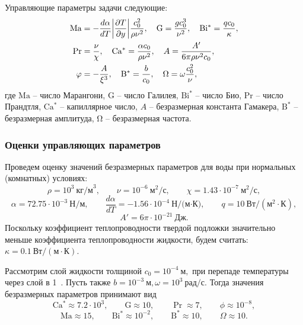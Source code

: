 \documentclass[12pt,a4paper]{article}
\begin{document}

Управляющие параметры задачи следующие:
\begin{equation*}
\begin{aligned}
	\mathrm{Ma} &= -\frac{d \alpha}{dT}  \abs{\frac{\partial T}{\partial y} } \frac{c_0^2}{\rho \nu^2}, \quad
	\mathrm{G} = \frac{g c_0^3}{\nu^2}, \quad
	\mathrm{Bi^*} = \frac{q c_0}{\kappa}, \\
	\mathrm{Pr} &= \frac{\nu}{\chi}, \quad
	\mathrm{Ca^*} = \frac{\alpha c_0}{\rho \nu^2}, \quad
	A = \frac{A'}{6 \pi \rho \nu^2 c_0}, \\
	\varphi &= -\frac{A}{\xi^3}, \quad
	\mathrm{B}^{*} = \frac{b}{c_0}, \quad
	\Omega = \omega \frac{c_0^2}{\nu},
\end{aligned}
\end{equation*}
где $\mathrm{Ma}$ -- число Марангони, $\mathrm{G}$ -- число Галилея, $\mathrm{Bi^*}$ -- число Био, $\mathrm{Pr}$ -- число Прандтля, $\mathrm{Ca^*}$ -- капиллярное число, ${A}$ -- безразмерная константа Гамакера, $\mathrm{B^*}$ -- безразмерная амплитуда, $\mathrm{\Omega}$ -- безразмерная частота.


\subsubsection*{Оценки управляющих параметров}\label{sec:governing_params_estimation_thermal}

Проведем оценку значений безразмерных параметров для воды при нормальных (комнатных) условиях:
\[
\rho = 10^3~\text{кг/м}^3,\qquad
\nu = 10^{-6}~\text{м}^2/\text{с},\qquad
\chi = 1.43 \cdot 10^{-7}~\text{м}^2/\text{с},
\]
\[
\alpha = 72.75 \cdot 10^{-3}~\text{Н/м}, \qquad
\frac{d\alpha}{dT} = -1.56 \cdot 10^{-4}~\text{Н/(м·К)}, \qquad
q = 10~\text{Вт}/(\text{м}^2 \cdot \text{К}),
\]
\[
A' = 6\pi \cdot 10^{-21}~\text{Дж}. 
\]
Поскольку коэффициент теплопроводности твердой подложки значительно меньше коэффициента теплопроводности жидкости, будем считать: $\kappa = 0.1~\text{Вт}/(\text{м}\cdot\text{К}).$

Рассмотрим слой жидкости толщиной $c_0 = 10^{-4}~\text{м},$ при перепаде температуры через слой в 1~. Пусть также $ b = 10^{-3}~\text{м},\omega = 10^3~\text{рад/с}.$
Тогда значения безразмерных параметров принимают вид
\begin{equation*}
	\mathrm{Ca^*} \approx 7.2 \cdot 10^3,\qquad
	\mathrm{G} \approx 10,\qquad
	\Pr \approx 7,\qquad
	\phi \approx 10^{-8},
\end{equation*}
\begin{equation*}
	\mathrm{Ma} \approx 15,\qquad
	\mathrm{Bi^*} \approx 10^{-2},\qquad
	\mathrm{B^{*}}\approx 10,\qquad
	\Omega \approx 10.
\end{equation*}
\end{document}
